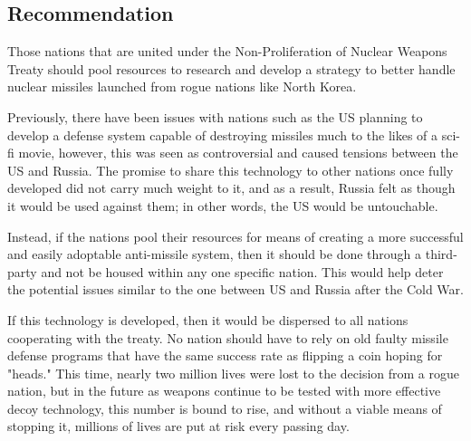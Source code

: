 \documentclass[12pt]{turabian-researchpaper}
\begin{document}
	\subsection{Recommendation}

	Those nations that are united under the Non-Proliferation of Nuclear Weapons Treaty should pool resources to research and develop a strategy to better handle nuclear missiles launched from rogue nations like North Korea. 

	Previously, there have been issues with nations such as the US planning to develop a defense system capable of destroying missiles much to the likes of a sci-fi movie, however, this was seen as controversial and caused tensions between the US and Russia. The promise to share this technology to other nations once fully developed did not carry much weight to it, and as a result, Russia felt as though it would be used against them; in other words, the US would be untouchable. 

	Instead, if the nations pool their resources for means of creating a more successful and easily adoptable anti-missile system, then it should be done through a third-party and not be housed within any one specific nation. This would help deter the potential issues similar to the one between US and Russia after the Cold War. 

	If this technology is developed, then it would be dispersed to all nations cooperating with the treaty. No nation should have to rely on old faulty missile defense programs that have the same success rate as flipping a coin hoping for "heads." This time, nearly two million lives were lost to the decision from a rogue nation, but in the future as weapons continue to be tested with more effective decoy technology, this number is bound to rise, and without a viable means of stopping it, millions of lives are put at risk every passing day. 


\newpage
\begin{thebibliography}{1}
\end{thebibliography}
\end{document}
